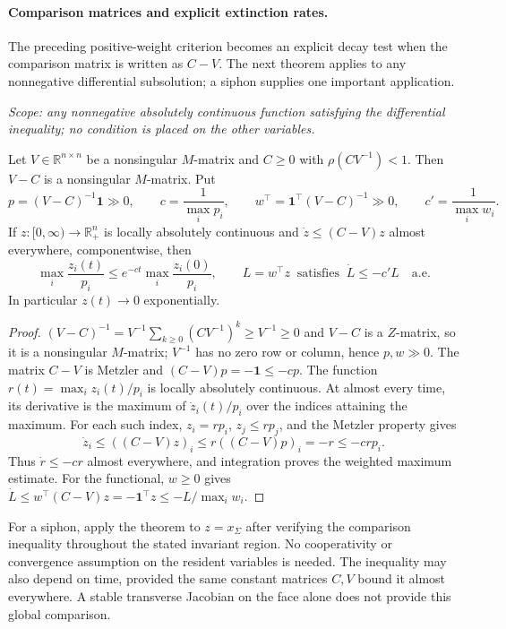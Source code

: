 \paragraph{Comparison matrices and explicit extinction rates.}
The preceding positive-weight criterion becomes an explicit decay test
when the comparison matrix is written as $C-V$. The next theorem applies
to any nonnegative differential subsolution; a siphon supplies one
important application.

\emph{Scope: any nonnegative absolutely continuous function satisfying the
differential inequality; no condition is placed on the other variables.}

Let $V\in\mathbb R^{n\times n}$ be a nonsingular $M$-matrix and $C\ge0$ with $\rho(CV^{-1})<1$.
Then $V-C$ is a nonsingular $M$-matrix. Put
\[
 p=(V-C)^{-1}\mathbf1\gg0,\qquad c=\frac1{\max_ip_i},\qquad
 w^\top=\mathbf1^\top(V-C)^{-1}\gg0,\qquad c'=\frac1{\max_iw_i}.
\]
If $z:[0,\infty)\to\mathbb R_+^n$ is locally absolutely continuous and
$\dot z\le(C-V)z$ almost everywhere, componentwise, then
\[
 \max_i\frac{z_i(t)}{p_i}\le e^{-ct}\max_i\frac{z_i(0)}{p_i},\qquad
 L=w^\top z\ \text{ satisfies }\ \dot L\le-c'L\quad\text{a.e.}
\]
In particular $z(t)\to0$ exponentially.
\eeT
\begin{proof}
$(V-C)^{-1}=V^{-1}\sum_{k\ge0}(CV^{-1})^k\ge V^{-1}\ge0$ and $V-C$ is a
$Z$-matrix, so it is a nonsingular $M$-matrix; $V^{-1}$ has no zero row or
column, hence $p,w\gg0$. The matrix $C-V$ is Metzler and $(C-V)p=-\mathbf1\le-cp$.
The function $r(t)=\max_i z_i(t)/p_i$ is locally absolutely continuous.
At almost every time, its derivative is the maximum of
$\dot z_i(t)/p_i$ over the indices attaining the maximum. For each such
index, $z_i=rp_i$, $z_j\le rp_j$, and the Metzler property gives
\[
 \dot z_i\le((C-V)z)_i\le r((C-V)p)_i=-r\le-crp_i.
\]
Thus $\dot r\le-cr$ almost everywhere, and integration proves the
weighted maximum estimate. For the functional, $w\ge0$ gives
$\dot L\le w^\top(C-V)z=-\mathbf1^\top z\le-L/\max_iw_i$.
\end{proof}


For a siphon, apply the theorem to $z=x_\Sigma$ after verifying the
comparison inequality throughout the stated invariant region. No
cooperativity or convergence assumption on the resident variables is
needed. The inequality may also depend on time, provided the same
constant matrices $C,V$ bound it almost everywhere. A stable transverse
Jacobian on the face alone does not provide this global comparison.


